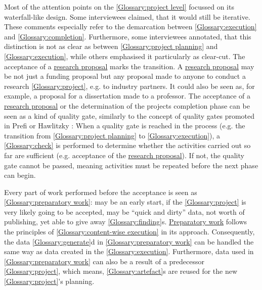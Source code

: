\documentclass{bausteinefdm}
\begin{document}
Most of the attention points on the \ref{Glossary:project level} focussed on its waterfall-like design.
Some interviewees claimed, that it would still be iterative.
These comments especially refer to the demarcation between \ref{Glossary:execution} and \ref{Glossary:completion}.
Furthermore, some interviewees annotated, that this distinction is not as clear as between \ref{Glossary:project planning} and \ref{Glossary:execution}, while others emphasised it particularly as clear-cut.
The acceptance of a \hyperref[Glossary:research proposal]{research proposal} marks the transition. 
A \hyperref[Glossary:research proposal]{research proposal} may be not just a funding proposal but any proposal made to anyone to conduct a research \ref{Glossary:project}, e.g. to industry partners.
It could also be seen as, for example, a proposal for a dissertation made to a professor. The acceptance of a \hyperref[Glossary:research proposal]{research proposal} or the determination of the projects completion phase can be seen as a kind of quality gate, similarly to the concept of quality gates promoted in Prefi \cite{Prefi.2014} or Hawlitzky \cite{Hawlitzky.2002}: When a quality gate is reached in the process (e.g. the transition from \ref{Glossary:project planning} to \ref{Glossary:execution}), a \ref{Glossary:check} is performed to determine whether the activities carried out so far are sufficient (e.g. acceptance of the \hyperref[Glossary:research proposal]{research proposal}). If not, the quality gate cannot be passed, meaning activities must be repeated before the next phase can begin. %

Every part of work performed before the acceptance is seen as \ref{Glossary:preparatory work}: may be an early start, if the \ref{Glossary:project} is very likely going to be accepted,  may be \enquote{quick and dirty} data, not worth of publishing, yet able to give away \ref{Glossary:finding}s.
\hyperref[Glossary:preparatory work]{Preparatory work} follows the principles of \ref{Glossary:content-wise execution} in its approach.
Consequently, the data \ref{Glossary:generate}d in \ref{Glossary:preparatory work} can be handled the same way as data created in the \ref{Glossary:execution}.
Furthermore, data used in \ref{Glossary:preparatory work} can also be a result of a predecessor \ref{Glossary:project}, which means, \ref{Glossary:artefact}s are reused for the new \ref{Glossary:project}'s planning.
\end{document}
